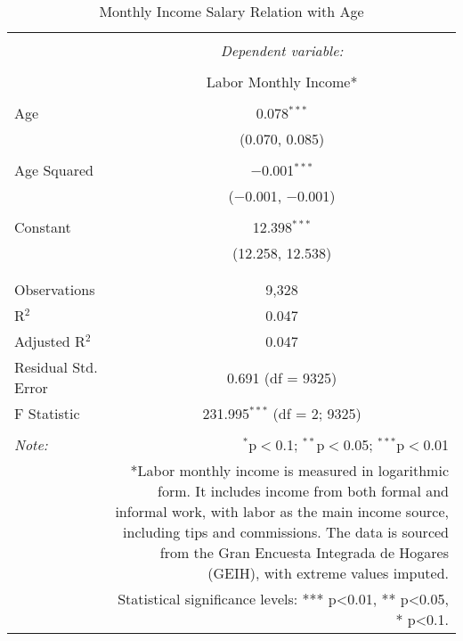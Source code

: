 
\begin{table}[!htbp] \centering 
  \caption{Monthly Income Salary Relation with Age} 
  \label{} 
\begin{tabular}{@{\extracolsep{5pt}}lc} 
\\[-1.8ex]\hline 
\hline \\[-1.8ex] 
 & \multicolumn{1}{c}{\textit{Dependent variable:}} \\ 
\cline{2-2} 
\\[-1.8ex] & Labor Monthly Income* \\ 
\hline \\[-1.8ex] 
 Age & 0.078$^{***}$ \\ 
  & (0.070, 0.085) \\ 
  & \\ 
 Age Squared & $-$0.001$^{***}$ \\ 
  & ($-$0.001, $-$0.001) \\ 
  & \\ 
 Constant & 12.398$^{***}$ \\ 
  & (12.258, 12.538) \\ 
  & \\ 
\hline \\[-1.8ex] 
Observations & 9,328 \\ 
R$^{2}$ & 0.047 \\ 
Adjusted R$^{2}$ & 0.047 \\ 
Residual Std. Error & 0.691 (df = 9325) \\ 
F Statistic & 231.995$^{***}$ (df = 2; 9325) \\ 
\hline 
\hline \\[-1.8ex] 
\textit{Note:}  & \multicolumn{1}{r}{$^{*}$p$<$0.1; $^{**}$p$<$0.05; $^{***}$p$<$0.01} \\ 
 & \multicolumn{1}{r}{*Labor monthly income is measured in logarithmic form. It includes income from both formal and informal work, with labor as the main income source, including tips and commissions. The data is sourced from the Gran Encuesta Integrada de Hogares (GEIH), with extreme values imputed.} \\ 
 & \multicolumn{1}{r}{Statistical significance levels: *** p<0.01, ** p<0.05, * p<0.1.} \\ 
\end{tabular} 
\end{table} 
